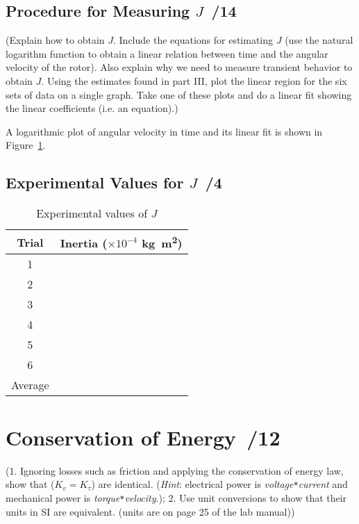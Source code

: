 \documentclass{article}
\newcommand{\score}{\hfill \underline{\hspace{0.65cm}}\,/} %
\begin{document}
\subsection{Procedure for Measuring $J$ \score 14}
(Explain how to obtain $J$. Include the equations for estimating $J$ (use the natural logarithm function to obtain a linear relation between time and the angular velocity of the rotor). Also explain why we need to measure transient behavior to obtain $J$. Using the estimates found in part III, plot the linear region for the six sets of data on a single graph. Take one of these plots and do a linear fit showing the linear coefficients (i.e. an equation).)

A logarithmic plot of angular velocity in time and its linear fit is shown in Figure~\ref{fig:lab4_q5}.



\subsection{Experimental Values for $J$ \score 4}
\begin{table}[phtb] 
\begin{center}
\caption{Experimental values of $J$}
\label{fig:lab4_q5}
\begin{tabular}{c|l}\hline \hline
\cellcolor{lightgray} Trial & \cellcolor{lightgray} Inertia ($\times10^{-4}$ \si{\kg\m\squared}) \\
\hline
1 &  \\ \hline
2 &  \\ \hline
3 &  \\ \hline
4 &  \\ \hline
5 &  \\ \hline
6 &  \\ \hline
Average &  \\ \hline
\end{tabular}
\end{center}
\end{table}

\section{Conservation of Energy \score 12}
(1. Ignoring losses such as friction and applying the conservation of energy law, show that ($K_v=K_{\tau}$) are identical. (\emph{Hint}: electrical power is \emph{voltage}\verb|*|\emph{current} and mechanical power is \emph{torque}\verb|*|\emph{velocity}.); 2. Use unit conversions to show that their units in SI are equivalent. (units are on page 25 of the lab manual))
\end{document}
